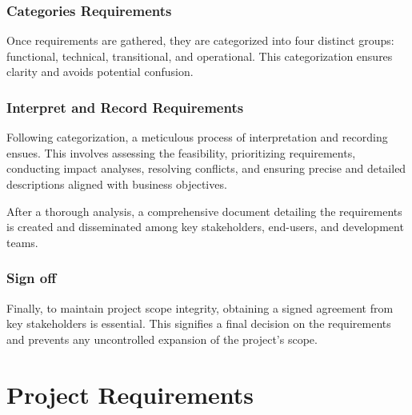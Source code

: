 \subsubsection{Categories Requirements}
Once requirements are gathered, they are categorized into four distinct groups: functional, technical, transitional, and operational. This categorization ensures clarity and avoids potential confusion.


\subsubsection{Interpret and Record Requirements}
Following categorization, a meticulous process of interpretation and recording ensues. This involves assessing the feasibility, prioritizing requirements, conducting impact analyses, resolving conflicts, and ensuring precise and detailed descriptions aligned with business objectives.

After a thorough analysis, a comprehensive document detailing the requirements is created and disseminated among key stakeholders, end-users, and development teams.

\subsubsection{Sign off}
Finally, to maintain project scope integrity, obtaining a signed agreement from key stakeholders is essential. This signifies a final decision on the requirements and prevents any uncontrolled expansion of the project's scope.

\section{Project Requirements}











